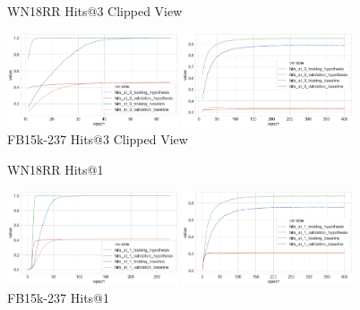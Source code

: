 \begin{figure}[H]
	\parbox{.5\linewidth}{
   		\caption{WN18RR Hits@3 Clipped View}
   		\centering
    		\includegraphics[width=0.45\textwidth, height=0.2\textheight]{WN18RR_hits_at_3_Results_Clipped}
		}
	\hfill
	\parbox{.5\linewidth}{
		\caption{FB15k-237 Hits@3  Clipped View}
   		\centering
		\includegraphics[width=0.45\textwidth, height=0.2\textheight]{FB15k-237_hits_at_3_Results_Clipped}
		}
\end{figure}


\begin{figure}[H]
	\parbox{.5\linewidth}{
   		\caption{WN18RR Hits@1}
   		\centering
    		\includegraphics[width=0.45\textwidth, height=0.2\textheight]{WN18RR_hits_at_1_Results}
		}
	\hfill
	\parbox{.5\linewidth}{
		\caption{FB15k-237 Hits@1}
   		\centering
		\includegraphics[width=0.45\textwidth, height=0.2\textheight]{FB15k-237_hits_at_1_Results}
		}
\end{figure}

